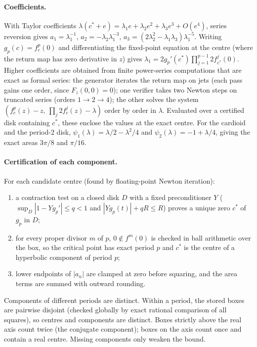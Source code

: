 \documentclass[11pt]{article}
\begin{document}
\paragraph{Coefficients.} With Taylor coefficients $\lambda(c^*+e)=\lambda_1e+\lambda_2e^2+\lambda_3e^3+O(e^4)$, series reversion gives $a_1=\lambda_1^{-1}$, $a_2=-\lambda_2\lambda_1^{-3}$, $a_3=(2\lambda_2^2-\lambda_1\lambda_3)\lambda_1^{-5}$. Writing $g_p(c)=f_c^p(0)$ and differentiating the fixed-point equation at the centre (where the return map has zero derivative in $z$) gives $\lambda_1=2g_p'(c^*)\prod_{j=1}^{p-1}2f^j_{c^*}(0)$. Higher coefficients are obtained from finite power-series computations that are exact as formal series: the generator iterates the return map on jets (each pass gains one order, since $F_z(0,0)=0$); one verifier takes two Newton steps on truncated series (orders $1\to2\to4$); the other solves the system $(f_c^p(z)-z,\ \prod_j 2f_c^j(z)-\lambda)$ order by order in $\lambda$. Evaluated over a certified disk containing $c^*$, these enclose the values at the exact centre. For the cardioid and the period-2 disk, $\psi_1(\lambda)=\lambda/2-\lambda^2/4$ and $\psi_2(\lambda)=-1+\lambda/4$, giving the exact areas $3\pi/8$ and $\pi/16$.

\paragraph{Certification of each component.} For each candidate centre (found by floating-point Newton iteration):
\begin{enumerate}
\item a contraction test on a closed disk $D$ with a fixed preconditioner $Y$ ($\sup_D|1-Yg_p'|\le q<1$ and $|Yg_p(t)|+qR\le R$) proves a unique zero $c^*$ of $g_p$ in $D$;
\item for every proper divisor $m$ of $p$, $0\notin f^m(0)$ is checked in ball arithmetic over the box, so the critical point has exact period $p$ and $c^*$ is the centre of a hyperbolic component of period $p$;
\item lower endpoints of $|a_n|$ are clamped at zero before squaring, and the area terms are summed with outward rounding.
\end{enumerate}
Components of different periods are distinct. Within a period, the stored boxes are pairwise disjoint (checked globally by exact rational comparison of all squares), so centres and components are distinct. Boxes strictly above the real axis count twice (the conjugate component); boxes on the axis count once and contain a real centre. Missing components only weaken the bound.
\end{document}
